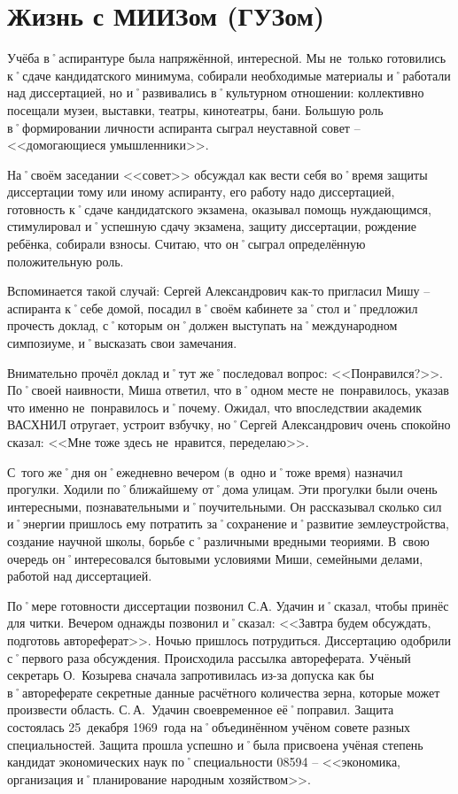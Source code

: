 ﻿\chapter{Жизнь с МИИЗом (ГУЗом)}

Учёба в˚аспирантуре была напряжённой, интересной. Мы не~только готовились к˚сдаче кандидатского минимума, собирали необходимые материалы и˚работали над диссертацией, но и˚развивались в˚культурном отношении: коллективно посещали музеи, выставки, театры, кинотеатры, бани. Большую роль в˚формировании личности аспиранта сыграл неуставной совет \--- <<домогающиеся умышленники>>. 

На˚своём заседании <<совет>> обсуждал как вести себя во˚время защиты диссертации тому или иному аспиранту, его работу надо диссертацией, готовность к˚сдаче кандидатского экзамена, оказывал помощь нуждающимся, стимулировал и˚успешную сдачу экзамена, защиту диссертации, рождение ребёнка, собирали взносы. Считаю, что он˚сыграл определённую положительную роль.

Вспоминается такой случай: Сергей Александрович как-то пригласил Мишу \--- аспиранта к˚себе домой, посадил в˚своём кабинете за˚стол и˚предложил прочесть доклад, с˚которым он˚должен выступать на˚международном симпозиуме, и˚высказать свои замечания.

Внимательно прочёл доклад и˚тут же˚последовал вопрос: <<Понравился?>>. По˚своей наивности, Миша ответил, что в˚одном месте не~понравилось, указав что именно не~понравилось и˚почему. Ожидал, что впоследствии академик ВАСХНИЛ отругает, устроит взбучку, но˚Сергей Александрович очень спокойно сказал: <<Мне тоже здесь не~нравится, переделаю>>.

С~того же˚дня он˚ежедневно вечером (в~одно и˚тоже время) назначил прогулки. Ходили по˚ближайшему от˚дома улицам. Эти прогулки были очень интересными, познавательными и˚поучительными. Он рассказывал сколько сил и˚энергии пришлось ему потратить за˚сохранение и˚развитие землеустройства, создание научной школы, борьбе с˚различными вредными теориями. В~свою очередь он˚интересовался бытовыми условиями Миши, семейными делами, работой над диссертацией.

По˚мере готовности диссертации позвонил С.А. Удачин и˚сказал, чтобы принёс для читки. Вечером однажды позвонил и˚сказал: <<Завтра будем обсуждать, подготовь автореферат>>. Ночью пришлось потрудиться. Диссертацию одобрили с˚первого раза обсуждения. Происходила рассылка автореферата. Учёный секретарь О.~Козырева сначала запротивилась из-за допуска как бы в˚автореферате секретные данные расчётного количества зерна, которые может произвести область. С.\,А.~Удачин своевременное её˚поправил. Защита состоялась 25~декабря 1969~года на˚объединённом учёном совете разных специальностей. Защита прошла успешно и˚была присвоена учёная степень кандидат экономических наук по˚специальности 08594 \--- <<экономика, организация и˚планирование народным хозяйством>>. 

